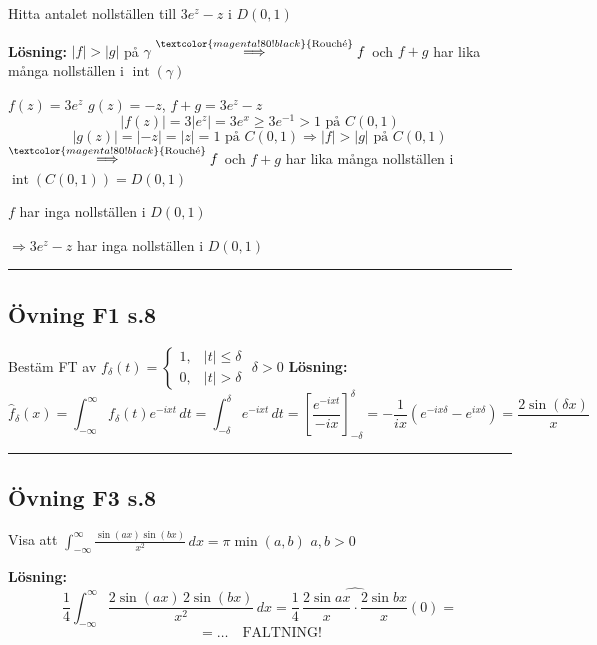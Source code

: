  \quad Hitta antalet nollställen till $3e^z - z$ i $D(0, 1)$

\textbf{Lösning:} $|f| > |g|$ på $\gamma$
$\overset{\textcolor{magenta!80!black}{\text{Rouché}}}{\Longrightarrow} f$ och $f + g$ har lika många nollställen i $\operatorname{int}(\gamma)$

$f(z) = 3e^z$ \quad $g(z) = -z$, \quad $f + g = 3e^z - z$
\[ |f(z)| = 3|e^z| = 3e^x \ge 3e^{-1} > 1 \text{ på } C(0, 1) \]
\[ |g(z)| = |-z| = |z| = 1 \text{ på } C(0, 1) \Rightarrow |f| > |g| \text{ på } C(0, 1) \]
$\overset{\textcolor{magenta!80!black}{\text{Rouché}}}{\Longrightarrow} f$ och $f + g$ har lika många nollställen i $\operatorname{int}(C(0, 1)) = D(0, 1)$

$f$ har inga nollställen i $D(0, 1)$

$\Rightarrow 3e^z - z$ har inga nollställen i $D(0, 1)$


\noindent\rule{\linewidth}{0.4pt}

\subsection{Övning F1 s.8}
Bestäm FT av $f_{\delta}(t) = \begin{cases} 1, & |t| \le \delta \\ 0, & |t| > \delta \end{cases}$ \quad $\delta > 0$
\textbf{Lösning:}
\[ \hat{f}_\delta(x) = \int_{-\infty}^\infty f_\delta(t)e^{-ixt}\,dt = \int_{-\delta}^\delta e^{-ixt}\,dt = \left[ \frac{e^{-ixt}}{-ix} \right]_{-\delta}^\delta = -\frac{1}{ix}\left( e^{-ix\delta} - e^{ix\delta} \right) = \frac{2\sin(\delta x)}{x} \]

\noindent\rule{\linewidth}{0.4pt}

\subsection{Övning F3 s.8}
Visa att $\displaystyle\int_{-\infty}^\infty \frac{\sin(ax)\sin(bx)}{x^2}\,dx = \pi \min(a, b)$ \quad $a, b > 0$

\textbf{Lösning:}
\[ \frac{1}{4} \int_{-\infty}^\infty \frac{2\sin(ax)\,2\sin(bx)}{x^2}\,dx = \frac{1}{4}\, \widehat{\frac{2\sin ax}{x} \cdot \frac{2\sin bx}{x}}(0) = \]
\[ = \dots \quad \text{FALTNING!} \]
